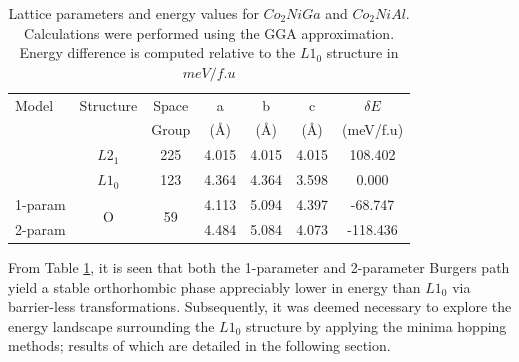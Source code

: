 \documentclass[%
preprint,
 amsmath,amssymb,
 aps,
prb,
showkeys,
]{revtex4-1}
\begin{document}
\begin{table}[ht]
\caption{Lattice parameters and energy values for  $Co_2NiGa$ and $Co_2NiAl$. Calculations were performed using the  GGA \cite{Perdew1992} approximation. Energy difference is computed relative to the  $L1_0$ structure in $meV/f.u$}
\setlength{\tabcolsep}{0.56cm}
\begin{tabular}{lcccccc}
\hline \hline
Model  & Structure          & Space               & a                         & b                         & c                         & $\delta E$ \\
        &                    & Group               & (\AA)                       & (\AA)                       & (\AA)                       & (meV/f.u)  \\ \hline 
        & $L2_1$             & 225                 & 4.015                     & 4.015                     & 4.015                     & 108.402    \\
        & $L1_0$             & 123                 & 4.364                     & 4.364                     & 3.598                     & 0.000      \\
1-param & \multirow{2}{*}{O} & \multirow{2}{*}{59} & 4.113                     & 5.094                     & 4.397                     & -68.747    \\
2-param &                    &                     & \multicolumn{1}{l}{4.484} & \multicolumn{1}{l}{5.084} & \multicolumn{1}{l}{4.073} &  -118.436  \\
\hline
\end{tabular}
\label{tab:CoNiGa_energy}
\end{table}


From Table \ref{tab:CoNiGa_energy}, it is seen that both the 1-parameter and 2-parameter Burgers path yield a stable orthorhombic phase appreciably lower in energy than $L1_0$ via barrier-less transformations. 
Subsequently, it was deemed necessary to explore the energy landscape surrounding the $L1_0$ structure by applying the minima hopping methods; results of which are detailed in the following section.
\end{document}
